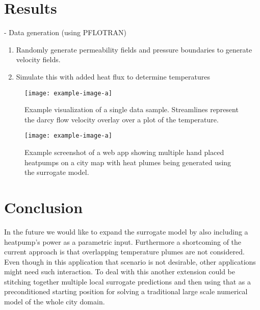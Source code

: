 \documentclass{article} %
\begin{document}



\section{Results}
\label{sec:results}


- Data generation (using PFLOTRAN)
\begin{enumerate}
\item Randomly generate permeability fields and pressure boundaries to generate velocity fields.
\item Simulate this with added heat flux to determine temperatures
\end{enumerate}

\begin{figure}[htb]
   \centering
   \texttt{[image: example-image-a]}
   \caption{Example visualization of a single data sample. Streamlines represent the darcy flow velocity overlay over a plot of the temperature.}
\end{figure}



\begin{figure}[htb]
   \centering
   \texttt{[image: example-image-a]}
   \caption{Example screenshot of a web app showing multiple hand placed heatpumps on a city map with heat plumes being generated using the surrogate model.}
\end{figure}

\section{Conclusion}
\label{sec:conclusion}




In the future we would like to expand the surrogate model by also including a heatpump's power as a parametric input.
Furthermore a shortcoming of the current approach is that overlapping temperature plumes are not considered.
Even though in this application that scenario is not desirable, other applications might need such interaction.
To deal with this another extension could be stitching together multiple local surrogate predictions and then using that as a preconditioned starting position for solving a traditional large scale numerical model of the whole city domain.
\end{document}
